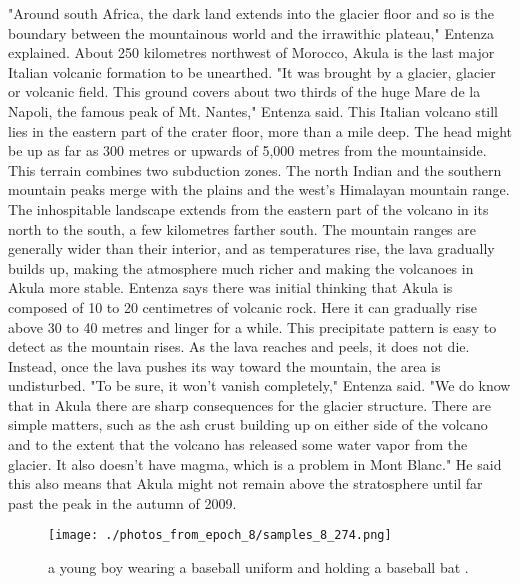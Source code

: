 \documentclass{article}%
\begin{document}
"Around south Africa, the dark land extends into the glacier floor and so is the boundary between the mountainous world and the irrawithic plateau," Entenza explained.\newline%
About 250 kilometres northwest of Morocco, Akula is the last major Italian volcanic formation to be unearthed.\newline%
"It was brought by a glacier, glacier or volcanic field. This ground covers about two thirds of the huge Mare de la Napoli, the famous peak of Mt. Nantes," Entenza said.\newline%
This Italian volcano still lies in the eastern part of the crater floor, more than a mile deep. The head might be up as far as 300 metres or upwards of 5,000 metres from the mountainside.\newline%
This terrain combines two subduction zones. The north Indian and the southern mountain peaks merge with the plains and the west’s Himalayan mountain range.\newline%
The inhospitable landscape extends from the eastern part of the volcano in its north to the south, a few kilometres farther south. The mountain ranges are generally wider than their interior, and as temperatures rise, the lava gradually builds up, making the atmosphere much richer and making the volcanoes in Akula more stable.\newline%
Entenza says there was initial thinking that Akula is composed of 10 to 20 centimetres of volcanic rock. Here it can gradually rise above 30 to 40 metres and linger for a while.\newline%
This precipitate pattern is easy to detect as the mountain rises. As the lava reaches and peels, it does not die. Instead, once the lava pushes its way toward the mountain, the area is undisturbed.\newline%
"To be sure, it won’t vanish completely," Entenza said.\newline%
"We do know that in Akula there are sharp consequences for the glacier structure. There are simple matters, such as the ash crust building up on either side of the volcano and to the extent that the volcano has released some water vapor from the glacier. It also doesn’t have magma, which is a problem in Mont Blanc."\newline%
He said this also means that Akula might not remain above the stratosphere until far past the peak in the autumn of 2009.\newline%

%


\begin{figure}[h!]%
\centering%
\texttt{[image: ./photos\_from\_epoch\_8/samples\_8\_274.png]}%
\caption{a young boy wearing a baseball uniform and holding a baseball bat .}%
\end{figure}

%
\end{document}
